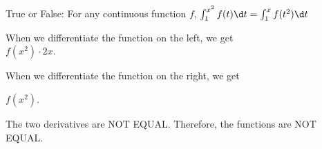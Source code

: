 \documentclass{ximera}
\author{Steven Gubkin}
\begin{document}
\begin{exercise}

True or False:  For any continuous function $f$, $\int_1^{x^2} f(t) \d t = \int_1^x f(t^2) \d t$

\begin{hint}

When we differentiate the function on the left, we get\\

$f(x^2)\cdot2x$.



When we differentiate the function on the right, we get

$f(x^2)$.


The two derivatives are NOT EQUAL.
Therefore, the functions are NOT EQUAL.
\end{hint}
\begin{prompt}
	\begin{multipleChoice}
	\end{multipleChoice}
\end{prompt}

\end{exercise}
\end{document}
